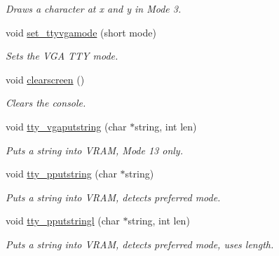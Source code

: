 \begin{DoxyCompactItemize}
\begin{DoxyCompactList}\small\item\em Draws a character at x and y in Mode 3. \end{DoxyCompactList}\item 
void \hyperlink{a00179_aaf55ee008e2e63ca97eacae371646db7_aaf55ee008e2e63ca97eacae371646db7}{set\+\_\+ttyvgamode} (short mode)
\begin{DoxyCompactList}\small\item\em Sets the V\+GA T\+TY mode. \end{DoxyCompactList}\item 
void \hyperlink{a00179_aff4bc17c602603d120756f52e18ebb96_aff4bc17c602603d120756f52e18ebb96}{clearscreen} ()
\begin{DoxyCompactList}\small\item\em Clears the console. \end{DoxyCompactList}\item 
void \hyperlink{a00179_a05ca3f5e64f38fec173b635ca8465415_a05ca3f5e64f38fec173b635ca8465415}{tty\+\_\+vgaputstring} (char $\ast$string, int len)
\begin{DoxyCompactList}\small\item\em Puts a string into V\+R\+AM, Mode 13 only. \end{DoxyCompactList}\item 
void \hyperlink{a00179_ade960b1320324706aac6c00cc6b1b2fe_ade960b1320324706aac6c00cc6b1b2fe}{tty\+\_\+pputstring} (char $\ast$string)
\begin{DoxyCompactList}\small\item\em Puts a string into V\+R\+AM, detects preferred mode. \end{DoxyCompactList}\item 
void \hyperlink{a00179_abaf93f9e56ddb7b10462070f59e534e4_abaf93f9e56ddb7b10462070f59e534e4}{tty\+\_\+pputstringl} (char $\ast$string, int len)
\begin{DoxyCompactList}\small\item\em Puts a string into V\+R\+AM, detects preferred mode, uses length. \end{DoxyCompactList}\end{DoxyCompactItemize}
